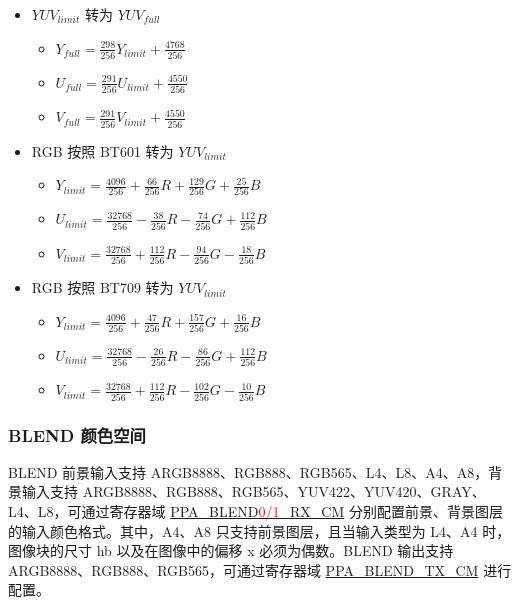 \documentclass[main\_\_CN.tex]{subfiles}
\begin{document}
\begin{itemize}
    \item $YUV_{limit}$ 转为 $YUV_{full}$
        \begin{itemize}
            \item $Y_{full} = \frac{298}{256} Y_{limit} + \frac{4768}{256}$
            \item $U_{full} = \frac{291}{256} U_{limit} + \frac{4550}{256}$
            \item $V_{full} = \frac{291}{256} V_{limit} + \frac{4550}{256}$
        \end{itemize}
    \item RGB 按照 BT601 转为 $YUV_{limit}$
        \begin{itemize}
            \item $Y_{limit} = \frac{4096}{256} + \frac{66}{256}R + \frac{129}{256}G + \frac{25}{256}B$
            \item $U_{limit} = \frac{32768}{256} - \frac{38}{256}R - \frac{74}{256}G + \frac{112}{256}B$
            \item $V_{limit} = \frac{32768}{256} + \frac{112}{256}R - \frac{94}{256}G - \frac{18}{256}B$
        \end{itemize}
    \item RGB 按照 BT709 转为 $YUV_{limit}$
        \begin{itemize}
            \item $Y_{limit} = \frac{4096}{256} + \frac{47}{256}R + \frac{157}{256}G + \frac{16}{256}B$
            \item $U_{limit} = \frac{32768}{256} - \frac{26}{256}R - \frac{86}{256}G + \frac{112}{256}B$
            \item $V_{limit} = \frac{32768}{256} + \frac{112}{256}R - \frac{102}{256}G - \frac{10}{256}B$
        \end{itemize}
\end{itemize}

\subsubsection{BLEND 颜色空间}
\label{sec:blend-color-space}
BLEND 前景输入支持 ARGB8888、RGB888、RGB565、L4、L8、A4、A8，背景输入支持 ARGB8888、RGB888、RGB565、YUV422、YUV420、GRAY、L4、L8，可通过寄存器域 \hyperref[fielddesc:PPABLEND0RXCM]{PPA\_BLEND\textcolor{red}{0/1}\_RX\_CM} 分别配置前景、背景图层的输入颜色格式。其中，A4、A8 只支持前景图层，且当输入类型为 L4、A4 时，图像块的尺寸 hb 以及在图像中的偏移 x 必须为偶数。BLEND 输出支持 ARGB8888、RGB888、RGB565，可通过寄存器域 \hyperref[fielddesc:PPABLENDTXCM]{PPA\_BLEND\_TX\_CM} 进行配置。
\end{document}
